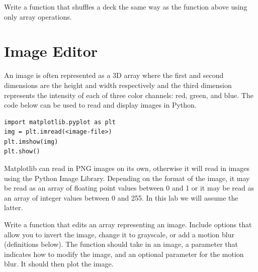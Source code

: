 \begin{problem}
Write a function that shuffles a deck the same way as the function above using only array operations.
\end{problem}

\section*{Image Editor}
An image is often represented as a 3D array where the first and second dimensions are the height and width respectively and the third dimension represents the intensity of each of three color channels: red, green, and blue.
The code below can be used to read and display images in Python.
\begin{lstlisting}
import matplotlib.pyplot as plt
img = plt.imread(<image-file>)
plt.imshow(img)
plt.show()
\end{lstlisting}

Matplotlib can read in PNG images on its own, otherwise it will read in images using the Python Image Library.
Depending on the format of the image, it may be read as an array of floating point values between 0 and 1 or it may be read as an array of integer values between 0 and 255.
In this lab we will assume the latter.

\begin{problem}
Write a function that edits an array representing an image.
Include options that allow you to  invert the image, change it to grayscale, or add a motion blur (definitions below).
The function should take in an image, a parameter that indicates how to modify the image, and an optional parameter for the motion blur.
It should then plot the image.
\end{problem}

